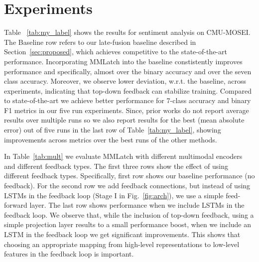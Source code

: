 \documentclass{article}
\begin{document}
\section{Experiments}
\label{sec:exp}

Table ~\ref{tab:my_label} shows the results for sentiment analysis on CMU-MOSEI.
The Baseline row refers to our late-fusion baseline described in Section~\ref{sec:proposed}, which achieves competitive to the state-of-the-art performance. 
Incorporating MMLatch into the baseline constistently improves performance and specifically, almost  over the binary accuracy and  over the seven class accuracy. 
Moreover, we observe lower deviation, w.r.t. the baseline, across experiments, indicating that top-down feedback can stabilize training.
Compared to state-of-the-art we achieve better performance for 7-class accuracy and binary F1 metrics in our five run experiments.
Since, prior works do not report average results over multiple runs so we also report results for the best (mean absolute error) out of five runs in the last row of Table~\ref{tab:my_label}, showing improvements across metrics over the best runs of the other methods.



In Table~\ref{tab:mult} we evaluate MMLatch with different multimodal encoders and different feedback types. The first three rows show the effect of using different feedback types. Specifically, first row shows our baseline performance (no feedback). For the second row we add feedback connections, but instead of using LSTMs in the feedback loop (Stage I in Fig.~\ref{fig:arch}), we use a simple feed-forward layer. The last row shows performance when we include LSTMs in the feedback loop. We observe that, while the inclusion of top-down feedback, using a simple projection layer results to a small performance boost, when we include an LSTM in the feedback loop we get significant improvements. This shows that choosing an appropriate mapping from high-level representations to low-level features in the feedback loop is important.
\end{document}
